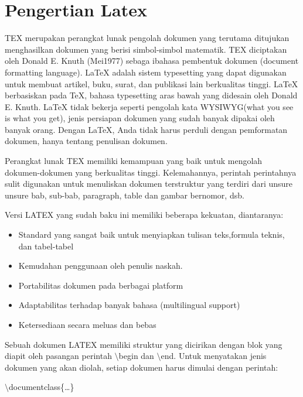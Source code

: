 \section {Pengertian Latex}\par
\vspace{12pt}
TEX merupakan perangkat lunak pengolah dokumen yang terutama ditujukan menghasilkan dokumen yang berisi simbol-simbol matematik. TEX diciptakan oleh Donald E. Knuth (Mei1977) sebaga ibahasa pembentuk dokumen (document formatting language). LaTeX adalah sistem typesetting yang 
dapat digunakan untuk membuat artikel, buku, surat, dan publikasi lain berkualitas tinggi. LaTeX berbasiskan pada TeX, bahasa typesetting aras bawah yang didesain oleh Donald E. Knuth. LaTeX tidak bekerja seperti pengolah kata WYSIWYG(what you see is what you get), jenis persiapan dokumen yang sudah banyak dipakai oleh banyak orang. Dengan LaTeX, Anda tidak harus perduli dengan pemformatan dokumen, hanya tentang penulisan dokumen.\par 
\vspace{12pt}

Perangkat lunak TEX memiliki kemampuan yang baik untuk mengolah dokumen-dokumen yang berkualitas tinggi. Kelemahannya, perintah perintahnya sulit digunakan untuk menuliskan dokumen terstruktur yang terdiri dari unsure unsure bab, sub-bab, paragraph, table dan gambar bernomor, dsb.\par 
\vspace{12pt}

Versi LATEX yang sudah baku ini memiliki beberapa kekuatan, diantaranya:

\begin{itemize}
\item Standard yang sangat baik untuk menyiapkan tulisan teks,formula 
teknis, dan tabel-tabel
\item Kemudahan penggunaan oleh penulis naskah.
\item Portabilitas dokumen pada berbagai platform
\item Adaptabilitas terhadap banyak bahasa (multilingual support)
\item Ketersediaan secara meluas dan bebas
\end{itemize}
\hspace{0,5in}Sebuah dokumen LATEX memiliki struktur yang dicirikan dengan blok yang diapit oleh pasangan perintah $\setminus$begin dan $\setminus$end. 
Untuk menyatakan jenis dokumen yang akan diolah, setiap dokumen harus dimulai dengan perintah:\par \vspace{12pt} $\setminus$documentclass\{\ldots \}\par \vspace{12pt}

